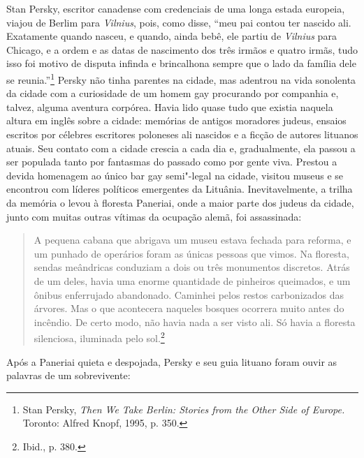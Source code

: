 Stan Persky, escritor canadense com credenciais de uma longa estada
europeia, viajou de Berlim para \textit{Vilnius}, pois, como disse, ``meu pai
contou ter nascido ali. Exatamente quando nasceu, e quando, ainda bebê,
ele partiu de \textit{Vilnius} para Chicago, e a ordem e as datas de nascimento
dos três irmãos e quatro irmãs, tudo isso foi motivo de disputa infinda
e brincalhona sempre que o lado da família dele se reunia.''\footnote{Stan Persky, \textit{Then We Take Berlin: Stories from the Other Side of Europe.} Toronto: Alfred Knopf, 1995, p. 350.} Persky não tinha parentes na cidade, mas adentrou na vida sonolenta da cidade com a
curiosidade de um homem gay procurando por companhia e, talvez, alguma
aventura corpórea. Havia lido quase tudo que existia naquela altura em
inglês sobre a cidade: memórias de antigos moradores judeus, ensaios
escritos por célebres escritores poloneses ali nascidos e a ficção de
autores lituanos atuais. Seu contato com a cidade crescia a cada dia e,
gradualmente, ela passou a ser populada tanto por fantasmas do passado
como por gente viva. Prestou a devida homenagem ao único bar gay
semi"-legal na cidade, visitou museus e se encontrou com líderes
políticos emergentes da Lituânia. Inevitavelmente, a trilha da memória o
levou à floresta Paneriai, onde a maior parte dos judeus da cidade,
junto com muitas outras vítimas da ocupação alemã, foi assassinada:

\begin{quote}
A pequena cabana que abrigava um museu estava fechada para reforma, e um
punhado de operários foram as únicas pessoas que vimos. Na floresta,
sendas meândricas conduziam a dois ou três monumentos discretos. Atrás
de um deles, havia uma enorme quantidade de pinheiros queimados, e um
ônibus enferrujado abandonado. Caminhei pelos restos carbonizados das
árvores. Mas o que acontecera naqueles bosques ocorrera muito antes do
incêndio. De certo modo, não havia nada a ser visto ali. Só havia a
floresta silenciosa, iluminada pelo sol.\footnote{Ibid., p. 380.}
\end{quote}

Após a Paneriai quieta e despojada, Persky e seu guia lituano foram
ouvir as palavras de um sobrevivente:

